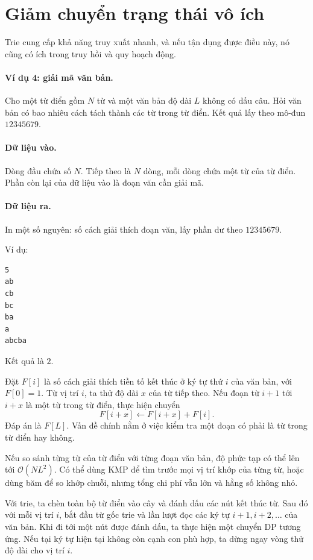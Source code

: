 \documentclass[11pt]{article}
\newcommand{\Oh}{\mathcal{O}}
\begin{document}
\section{Giảm chuyển trạng thái vô ích}

Trie cung cấp khả năng truy xuất nhanh, và nếu tận dụng được điều này, nó cũng
có ích trong truy hồi và quy hoạch động.

\paragraph{Ví dụ 4: giải mã văn bản.}
Cho một từ điển gồm \(N\) từ và một văn bản độ dài \(L\) không có dấu câu.
Hỏi văn bản có bao nhiêu cách tách thành các từ trong từ điển. Kết quả lấy
theo mô-đun \(12345679\).

\paragraph{Dữ liệu vào.}
Dòng đầu chứa số \(N\). Tiếp theo là \(N\) dòng, mỗi dòng chứa một từ của từ
điển. Phần còn lại của dữ liệu vào là đoạn văn cần giải mã.

\paragraph{Dữ liệu ra.}
In một số nguyên: số cách giải thích đoạn văn, lấy phần dư theo \(12345679\).

Ví dụ:
\begin{verbatim}
5
ab
cb
bc
ba
a
abcba
\end{verbatim}
Kết quả là \(2\).

Đặt \(F[i]\) là số cách giải thích tiền tố kết thúc ở ký tự thứ \(i\) của văn
bản, với \(F[0]=1\). Từ vị trí \(i\), ta thử độ dài \(x\) của từ tiếp theo.
Nếu đoạn từ \(i+1\) tới \(i+x\) là một từ trong từ điển, thực hiện chuyển
\[
  F[i+x] \gets F[i+x] + F[i].
\]
Đáp án là \(F[L]\). Vấn đề chính nằm ở việc kiểm tra một đoạn có phải là từ
trong từ điển hay không.

Nếu so sánh từng từ của từ điển với từng đoạn văn bản, độ phức tạp có thể lên
tới \(\Oh(NL^2)\). Có thể dùng KMP để tìm trước mọi vị trí khớp của từng từ,
hoặc dùng băm để so khớp chuỗi, nhưng tổng chi phí vẫn lớn và hằng số không
nhỏ.

Với trie, ta chèn toàn bộ từ điển vào cây và đánh dấu các nút kết thúc từ.
Sau đó với mỗi vị trí \(i\), bắt đầu từ gốc trie và lần lượt đọc các ký tự
\(i+1,i+2,\ldots\) của văn bản. Khi đi tới một nút được đánh dấu, ta thực hiện
một chuyển DP tương ứng. Nếu tại ký tự hiện tại không còn cạnh con phù hợp,
ta dừng ngay vòng thử độ dài cho vị trí \(i\).
\end{document}
